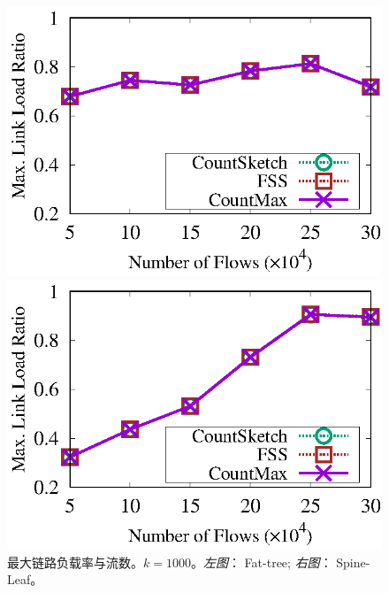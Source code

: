\begin{figure}[!t]
	\centering
	\begin{minipage}[t]{0.49\linewidth}
		\centering
		\includegraphics[width=\linewidth]{fig/ft_flow_load_1000.eps}
	\end{minipage}\vspace{-0.6em}%
	\begin{minipage}[t]{0.49\linewidth}
		\centering
		\includegraphics[width=\linewidth]{fig/hy_flow_load_1000.eps}
	\end{minipage} \vspace{-0.6em}%
	\caption{\textnormal{最大链路负载率与流数。$k=1000$。\textit{左图}： Fat-tree; \textit{右图}： Spine-Leaf。}}
	\label{fig:load,f}
\end{figure}


